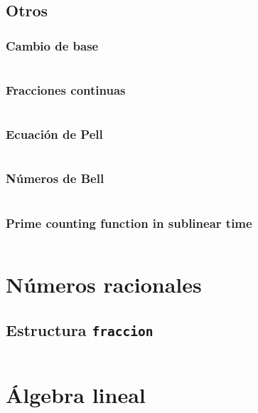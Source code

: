 \documentclass[11pt]{article}
\begin{document}
		\subsection{Otros}
			\subsubsection{Cambio de base}
			\inputminted[tabsize=2,breaklines,firstline=442,lastline=462,fontsize=\small]{c++}{numberTheory.cpp}
			
			\subsubsection{Fracciones continuas}
			\inputminted[tabsize=2,breaklines,firstline=598,lastline=640,fontsize=\small]{c++}{numberTheory.cpp}
			
			\subsubsection{Ecuación de Pell}
			\inputminted[tabsize=2,breaklines,firstline=642,lastline=655,fontsize=\small]{c++}{numberTheory.cpp}
			
			\subsubsection{Números de Bell}
			\inputminted[tabsize=2,breaklines,firstline=894,lastline=906,fontsize=\small]{c++}{numberTheory.cpp}
			
			\subsubsection{Prime counting function in sublinear time}
			\inputminted[tabsize=2,breaklines,firstline=27,lastline=77,fontsize=\small]{c++}{pi.cpp}
			
	\newpage
	\section{Números racionales}
		\subsection{Estructura \texttt{fraccion}}
		\inputminted[tabsize=2,breaklines,firstline=7,lastline=123,fontsize=\small]{c++}{fraccion.cpp}
		
	\newpage
	\section{Álgebra lineal}
\end{document}
